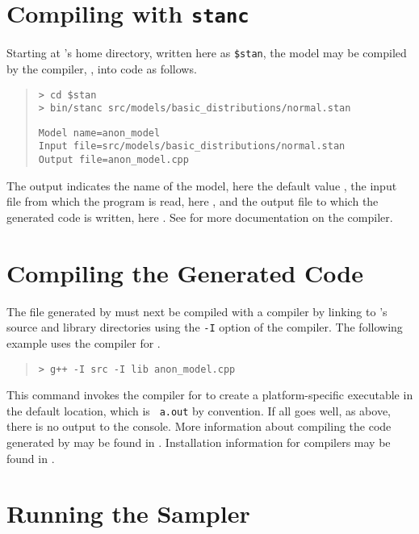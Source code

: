 \section{Compiling  with {\tt\bfseries stanc}}

Starting at \Stan's home directory, written here as {\tt \$stan},
the model may be compiled by the \Stan compiler, \stanc, into \Cpp code
as follows.
%
\begin{quote}
\begin{Verbatim}[fontshape=sl]
> cd $stan
> bin/stanc src/models/basic_distributions/normal.stan
\end{Verbatim}
%
\begin{Verbatim}
Model name=anon_model
Input file=src/models/basic_distributions/normal.stan
Output file=anon_model.cpp
\end{Verbatim}
\end{quote}
%
The output indicates the name of the model, here the default value
, the input file from which the \Stan program is
read, here , and the output file to which the
generated \Cpp code is written, here .  See
 for more documentation on the \stanc compiler.

\section{Compiling the Generated Code}

The file generated by \stanc must next be compiled with a \Cpp
compiler by linking to \Stan's source and library directories using
the {\tt -I} option of the compiler.  The following example 
uses the \clang compiler for \Cpp.
%
\begin{quote}
\begin{Verbatim}[fontshape=sl]
> g++ -I src -I lib anon_model.cpp 
\end{Verbatim}
\end{quote}
%
This command invokes the \clang compiler for \Cpp to create a
platform-specific executable in the default location, which is {\tt
  a.out} by convention.  If all goes well, as above, there is no
output to the console.  More information about compiling the \Cpp code
generated by \Stan may be found in .
Installation information for \Cpp compilers may be found in
.

\section{Running the Sampler}

